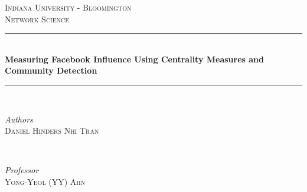 \documentclass[11pt,twocolumn]{article}
\begin{document}
\begin{titlepage} %
    \newcommand{\HRule}{\rule{\linewidth}{0.5mm}} %
    
    \center %
    
    
    \textsc{\LARGE Indiana University - Bloomington}\\[1.5cm] %
    
    \textsc{\Large Network Science}\\[0.5cm] %
        
    
    \HRule\\[0.4cm]
    
    {\huge\bfseries Measuring Facebook Influence Using Centrality Measures and Community Detection}\\[0.4cm] %
    
    \HRule\\[1.5cm]
    
    
    \begin{minipage}{0.4\textwidth}
        \begin{flushleft}
            \large
            \textit{Authors}\\
            \textsc{Daniel Hinders\newline} %
            \textsc{Nhi Tran} %

        \end{flushleft}


    \end{minipage}
    ~
    \begin{minipage}{0.4\textwidth}
        \begin{flushright}
            \large
            \textit{Professor}\\
            \textsc{Yong-Yeol (YY) Ahn} %
        \end{flushright}
    \end{minipage}
    

\end{titlepage}
\end{document}
